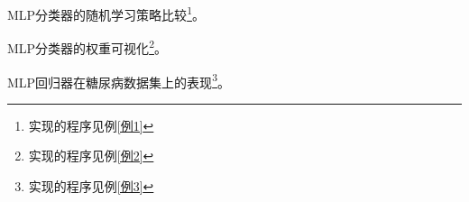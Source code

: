 \begin{Example}
	MLP分类器的随机学习策略比较\footnote{实现的程序见例\ref{例1}}。
\end{Example}

\begin{Example}
	MLP分类器的权重可视化\footnote{实现的程序见例\ref{例2}}。
\end{Example}

\begin{Example}
	MLP回归器在糖尿病数据集上的表现\footnote{实现的程序见例\ref{例3}}。
\end{Example}
